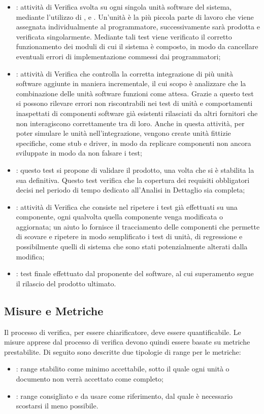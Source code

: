 \begin{itemize}
\item {}: attività di Verifica svolta su ogni singola unità software del sistema, mediante l'utilizzo di ,  e . Un'unità è la più piccola parte di lavoro che viene assegnata individualmente al programmatore, successivamente sarà prodotta e verificata singolarmente. Mediante tali test viene verificato il corretto funzionamento dei moduli di cui il sistema è composto, in modo da cancellare eventuali errori di implementazione commessi dai programmatori;
\item {}: attività di Verifica che controlla la corretta integrazione di più unità software aggiunte in maniera incrementale, il cui scopo è analizzare che la combinazione delle unità software funzioni come attesa. Grazie a questo test si possono rilevare errori non riscontrabili nei test di unità e comportamenti inaspettati di componenti software già esistenti rilasciati da altri fornitori che non interagiscono correttamente tra di loro. Anche in questa attività, per poter simulare le unità nell'integrazione, vengono create unità fittizie specifiche, come stub e driver, in modo da replicare componenti non ancora sviluppate in modo da non falsare i test;
\item {}: questo test si propone di validare il prodotto, una volta che si è stabilita  la sua  definitiva. Questo test verifica che la copertura dei requisiti obbligatori decisi nel periodo di tempo dedicato all'Analisi in Dettaglio sia completa;
\item {}: attività di Verifica che consiste nel ripetere i test già effettuati su una componente, ogni qualvolta quella componente venga modificata o aggiornata; un aiuto lo fornisce il tracciamento delle componenti che permette di scovare e ripetere in modo semplificato i test di unità, di regressione e possibilmente quelli di sistema che sono stati potenzialmente alterati dalla modifica;
\item {}: test finale effettuato dal proponente del software, al cui superamento segue il rilascio del prodotto ultimato.
\end{itemize}

\subsection{Misure e Metriche}
\label{4.0}
Il processo di verifica, per essere chiarificatore, deve essere quantificabile. Le misure apprese dal processo di verifica devono quindi essere basate su metriche prestabilite. Di seguito sono descritte due tipologie di range per le metriche:
\begin{itemize}
\item {}: range stabilito come minimo accettabile, sotto il quale ogni unità o documento non verrà accettato come completo;
\item {}: range consigliato e da usare come riferimento, dal quale è necessario scostarsi il meno possibile.
\end{itemize}

